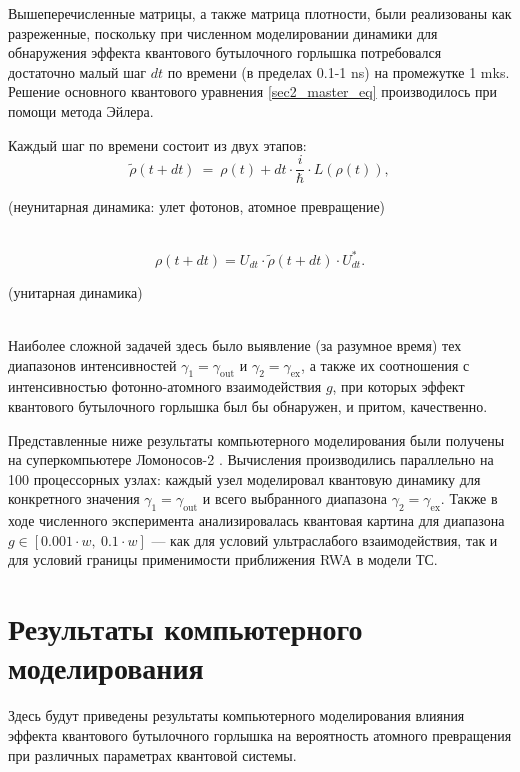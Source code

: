 \noindent Вышеперечисленные матрицы, а также матрица плотности, были реализованы как разреженные, поскольку при численном моделировании динамики для обнаружения эффекта квантового бутылочного горлышка потребовался достаточно малый шаг $dt$ по времени (в пределах 0.1-1 ns) на промежутке 1 mks. Решение основного квантового уравнения \eqref{sec2_master_eq} производилось при помощи метода Эйлера. 

\noindent Каждый шаг по времени состоит из двух этапов:
\[
\tilde{\rho}(t+dt)\ =\ \rho(t)+dt\cdot \frac{i}{\hbar}\cdot L(\rho(t)),
\]
\begin{center}\text(неунитарная динамика: улет фотонов, атомное превращение)\end{center}
\
\\[0pt]
\[
\rho(t+dt)=U_{dt}\cdot \tilde{\rho}(t+dt)\cdot U_{dt}^{*}.
\]
\begin{center}\text(унитарная динамика)\end{center}
\
\\
\indent Наиболее сложной задачей здесь было выявление (за разумное время) тех диапазонов интенсивностей $\gamma_{1} = \gamma_{\text{out}}$ и
$\gamma_{2} = \gamma_{\text{ex}}$, а также их соотношения с интенсивностью фотонно-атомного взаимодействия $g$, при которых эффект квантового бутылочного горлышка был бы обнаружен, и притом, качественно.

Представленные ниже результаты компьютерного моделирования были получены на суперкомпьютере Ломоносов-2 \cite{lomonosov_2}. Вычисления производились параллельно на 100 процессорных узлах: каждый узел моделировал квантовую динамику для конкретного значения $\gamma_{1} = \gamma_{\text{out}}$ и всего выбранного диапазона $\gamma_{2} = \gamma_{\text{ex}}$. Также в ходе численного эксперимента анализировалась квантовая картина для диапазона $g \in [0.001 \cdot w,~0.1 \cdot w]$ --- как для условий ультраслабого взаимодействия, так и для условий границы применимости приближения RWA \cite{rwa_rabi_1,rwa_rabi_2,ozhigov_qq} в модели ТС.

\section{Результаты компьютерного моделирования}\label{sec:ch2/sec3}
Здесь будут приведены результаты компьютерного моделирования влияния эффекта квантового бутылочного горлышка на вероятность атомного превращения при различных параметрах квантовой системы.

